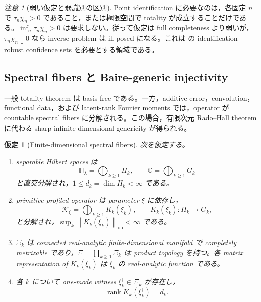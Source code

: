 \documentclass[11pt,a4paper]{ltjsarticle}
\newtheorem{assumption}{仮定}[section]
\theoremstyle{remark}
\newtheorem{remark}{注意}[section]
\newcommand{\norm}[1]{\left\lVert#1\right\rVert}
\newcommand{\Kop}{\mathscr K}
\newcommand{\rank}{\operatorname{rank}}
\newcommand{\op}{\operatorname{op}}
\begin{document}
\begin{remark}[弱い仮定と弱識別の区別]\label{rem:weakcontinuousassumptions}
Point identification に必要なのは，各固定 $n$ で $\tau_n\chi_n>0$ であること，または極限空間で totality が成立することだけである。$\inf_n\tau_n\chi_n>0$ は要求しない。従って仮定は full completeness より弱いが，$\tau_n\chi_n\downarrow0$ なら inverse problem は ill-posed になる。これは  の identification-robust confidence sets を必要とする領域である。
\end{remark}

\subsection{Spectral fibers と Baire-generic injectivity}

一般 totality theorem は basis-free である。一方，additive error，convolution，functional data，および latent-rank Fourier moments では，operator が countable spectral fibers に分解される。この場合，有限次元 Rado--Hall theorem に代わる sharp infinite-dimensional genericity が得られる。

\begin{assumption}[Finite-dimensional spectral fibers]\label{as:spectralfibers}
次を仮定する。
\begin{enumerate}[label=(SF\arabic*)]
\item separable Hilbert spaces は
\[
\mathbb H_\lambda=\bigoplus_{k\ge1}H_k,
\qquad
\mathbb G=\bigoplus_{k\ge1}G_k
\]
と直交分解され，$1\le d_k=\dim H_k<\infty$ である。
\item primitive profiled operator は parameter $\xi$ に依存し，
\begin{equation}
\Kop_\xi=\bigoplus_{k\ge1}K_k(\xi_k),
\qquad
K_k(\xi_k):H_k\to G_k,
\label{eq:fiberoperator}
\end{equation}
と分解され，$\sup_k\norm{K_k(\xi_k)}_{\op}<\infty$ である。
\item $\Xi_k$ は connected real-analytic finite-dimensional manifold で completely metrizable であり，$\Xi=\prod_{k\ge1}\Xi_k$ は product topology を持つ。各 matrix representation of $K_k(\xi_k)$ は $\xi_k$ の real-analytic function である。
\item 各 $k$ について one-mode witness $\xi_k^\dagger\in\Xi_k$ が存在し，
\begin{equation}
\rank K_k(\xi_k^\dagger)=d_k.
\label{eq:onemodewitness}
\end{equation}
\end{enumerate}
\end{assumption}
\end{document}
